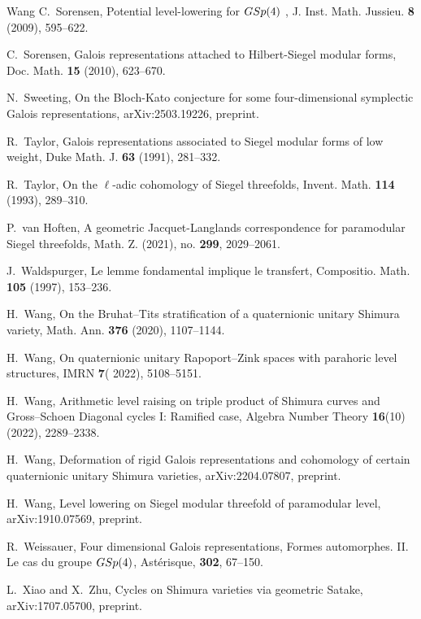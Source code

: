 \documentclass[10pt]{amsart}
\numberwithin{equation}{section}
\theoremstyle{definition}
\begin{document}
\begin{thebibliography}{Wang}
 C.~Sorensen, {Potential level-lowering for $\rm{GSp}(4)$ },
 {J. Inst. Math. Jussieu.}  {\bf 8} (2009), 595--622.   
 
 C.~Sorensen, {Galois representations attached to Hilbert-Siegel modular forms}, {Doc. Math.}  {\bf 15} (2010), 623--670. 
 
N.~Sweeting, {On the Bloch-Kato conjecture for some four-dimensional symplectic Galois representations}, {arXiv:2503.19226}, preprint.
 
 R.~Taylor, {Galois representations associated to Siegel modular forms of low
   weight}, {Duke Math. J.}  {\bf 63} (1991), 281--332.
 
 R.~Taylor, {On the $\ell$-adic cohomology of Siegel threefolds}, {Invent. Math.}  {\bf 114} (1993), 289--310. 

P.~van Hoften, A geometric Jacquet-Langlands correspondence for paramodular Siegel threefolds, 
{Math. Z.} (2021), no. {\bf 299},  2029--2061.

 J.~Waldspurger, {Le lemme fondamental implique le transfert}, {Compositio. Math.}  {\bf 105} (1997), 153--236.
 
H.~Wang, {On the Bruhat--Tits stratification of a quaternionic unitary Shimura variety}, {Math. Ann.} {\bf 376} (2020), 1107--1144.
 
H.~Wang, {On quaternionic unitary Rapoport--Zink spaces with parahoric level structures}, {IMRN} {\bf 7}( 2022), 5108--5151.

H.~Wang, { Arithmetic level raising on triple product of Shimura curves and Gross--Schoen Diagonal cycles I: Ramified case}, {Algebra Number Theory} {\bf 16}(10) (2022),  2289--2338.

H.~Wang, {Deformation of rigid Galois representations and cohomology of certain quaternionic unitary Shimura varieties}, {arXiv:2204.07807}, preprint.

H.~Wang, {Level lowering on Siegel modular threefold of paramodular level}, {arXiv:1910.07569}, preprint.

R.~Weissauer, {Four dimensional Galois representations}, {Formes automorphes. II. Le cas du groupe $\rm GSp(4)$}, {Ast\'{e}risque}, {\bf 302}, {67--150}.

L.~Xiao and X.~Zhu, {Cycles on Shimura varieties via geometric Satake}, {arXiv:1707.05700}, preprint.                           
                      
\end{thebibliography}
\end{document}
